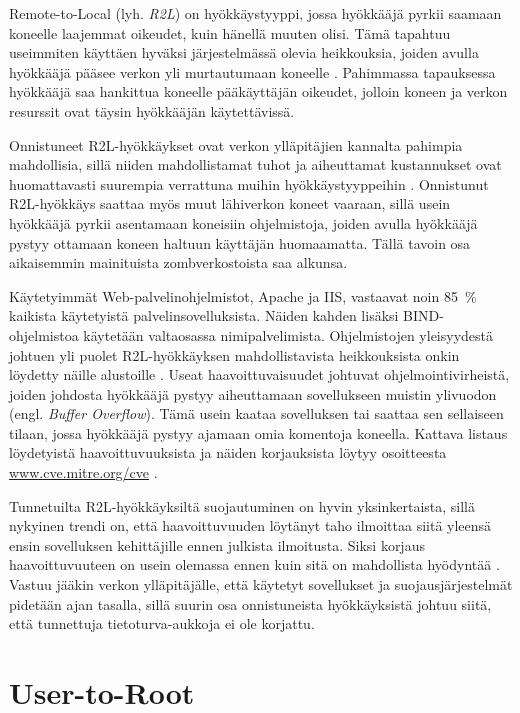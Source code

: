 Remote-to-Local (lyh. \textit{R2L}) on hyökkäystyyppi, jossa hyökkääjä pyrkii
saamaan koneelle laajemmat oikeudet, kuin hänellä muuten
olisi. Tämä tapahtuu useimmiten käyttäen hyväksi järjestelmässä olevia
heikkouksia, joiden avulla hyökkääjä pääsee verkon yli murtautumaan
koneelle \cite{IDS}. Pahimmassa tapauksessa hyökkääjä saa hankittua koneelle
pääkäyttäjän oikeudet, jolloin koneen ja verkon resurssit ovat täysin
hyökkääjän käytettävissä.

Onnistuneet R2L-hyökkäykset ovat verkon ylläpitäjien kannalta pahimpia
mahdollisia, sillä niiden mahdollistamat tuhot ja aiheuttamat kustannukset ovat
huomattavasti suurempia verrattuna muihin hyökkäystyyppeihin \cite{IDSb}. Onnistunut R2L-hyökkäys saattaa
myös muut lähiverkon koneet vaaraan, sillä usein hyökkääjä pyrkii asentamaan
koneisiin ohjelmistoja, joiden avulla hyökkääjä pystyy ottamaan koneen haltuun
käyttäjän huomaamatta. Tällä tavoin osa aikaisemmin mainituista
zombverkostoista saa alkunsa.

Käytetyimmät Web-palvelinohjelmistot, Apache ja IIS, vastaavat noin 85~\%
kaikista käytetyistä palvelinsovelluksista. Näiden kahden lisäksi
BIND-\-ohjelmistoa käytetään valtaosassa nimipalvelimista. Ohjelmistojen yleisyydestä
johtuen yli puolet R2L-hyökkäyksen mahdollistavista heikkouksista onkin
löydetty näille alustoille \cite{IDS}. Useat haavoittuvaisuudet johtuvat
ohjelmointivirheistä, joiden johdosta hyökkääjä pystyy aiheuttamaan
sovellukseen muistin ylivuodon (engl. \textit{Buffer Overflow}). Tämä usein kaataa
sovelluksen tai saattaa sen sellaiseen tilaan, jossa hyökkääjä pystyy ajamaan
omia komentoja koneella. Kattava listaus löydetyistä haavoittuvuuksista ja näiden
korjauksista löytyy osoitteesta \url{www.cve.mitre.org/cve} \cite{CVE}.

Tunnetuilta R2L-hyökkäyksiltä suojautuminen on hyvin yksinkertaista, sillä
nykyinen trendi on, että haavoittuvuuden löytänyt taho ilmoittaa siitä
yleensä ensin
sovelluksen kehittäjille ennen julkista ilmoitusta. Siksi korjaus
haavoittuvuuteen on usein olemassa ennen kuin sitä on mahdollista hyödyntää \cite{IDSb}.
Vastuu jääkin verkon ylläpitäjälle, että käytetyt sovellukset ja 
suojausjärjestelmät pidetään ajan tasalla, sillä suurin osa onnistuneista hyökkäyksistä 
johtuu siitä, että tunnettuja tietoturva-aukkoja ei ole korjattu.

\section{User-to-Root}

